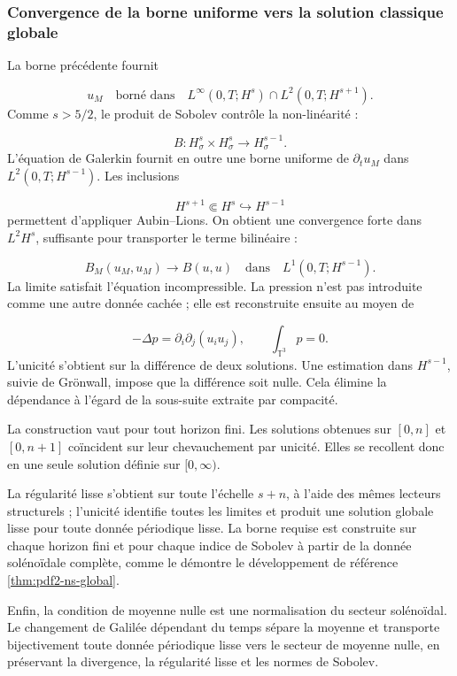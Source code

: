 \subsubsection{Convergence de la borne uniforme vers la solution classique globale}
La borne précédente fournit\par
\[
u_M
\quad\text{borné dans}\quad
L^\infty(0,T;H^s)
\cap L^2(0,T;H^{s+1}).
\]
Comme \(s>5/2\), le produit de Sobolev contrôle la non-linéarité :\par
\[
B:H^s_\sigma\times H^s_\sigma
\longrightarrow H^{s-1}_\sigma.
\]
L’équation de Galerkin fournit en outre une borne uniforme de \(\partial_tu_M\) dans \(L^2(0,T;H^{s-1})\). Les inclusions\par
\[
H^{s+1}\Subset H^s\hookrightarrow H^{s-1}
\]
permettent d’appliquer Aubin–Lions. On obtient une convergence forte dans \(L^2H^s\), suffisante pour transporter le terme bilinéaire :\par
\[
B_M(u_M,u_M)\longrightarrow B(u,u)
\quad\text{dans}\quad
L^1(0,T;H^{s-1}).
\]
La limite satisfait l’équation incompressible. La pression n’est pas introduite comme une autre donnée cachée ; elle est reconstruite ensuite au moyen de\par
\[
-\Delta p=\partial_i\partial_j(u_i u_j),
\qquad
\int_{\mathbb T^3}p=0.
\]
L’unicité s’obtient sur la différence de deux solutions. Une estimation dans \(H^{s-1}\), suivie de Grönwall, impose que la différence soit nulle. Cela élimine la dépendance à l’égard de la sous-suite extraite par compacité.\par
La construction vaut pour tout horizon fini. Les solutions obtenues sur \([0,n]\) et \([0,n+1]\) coïncident sur leur chevauchement par unicité. Elles se recollent donc en une seule solution définie sur \([0,\infty)\).\par
La régularité lisse s’obtient sur toute l’échelle \(s+n\), à l’aide des mêmes lecteurs structurels ; l’unicité identifie toutes les limites et produit une solution globale lisse pour toute donnée périodique lisse. La borne requise est construite sur chaque horizon fini et pour chaque indice de Sobolev à partir de la donnée solénoïdale complète, comme le démontre le développement de référence \cref{thm:pdf2-ns-global}.\par
Enfin, la condition de moyenne nulle est une normalisation du secteur solénoïdal. Le changement de Galilée dépendant du temps sépare la moyenne et transporte bijectivement toute donnée périodique lisse vers le secteur de moyenne nulle, en préservant la divergence, la régularité lisse et les normes de Sobolev.\par
{}
